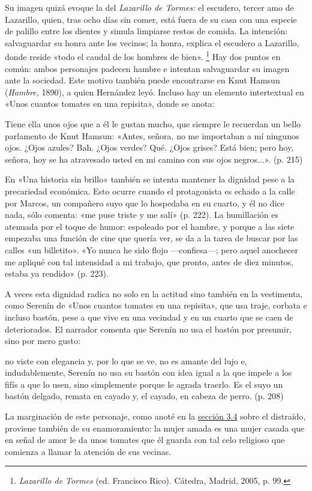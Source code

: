 \documentclass[14pt,twoside,final]{extbook} %
\let\oldfootnote\footnote
\renewcommand\footnote[1]{%
\oldfootnote{\hspace{1mm}#1}}
\begin{document}
Su imagen quizá evoque la del \emph{Lazarillo de Tormes:} el escudero, tercer amo de Lazarillo, quien, tras ocho días sin comer, está fuera de su casa con una especie de palillo entre los dientes y simula limpiarse restos de comida. La intención: salvaguardar su honra ante los vecinos; la honra, explica el escudero a Lazarillo, donde reside «todo el caudal de los hombres de bien».\footnote{\emph{Lazarillo de Tormes} (ed. Francisco Rico). Cátedra, Madrid, 2005, p. 99.} Hay dos puntos en común: ambos personajes padecen hambre e intentan salvaguardar su imagen ante la sociedad. Este motivo también puede encontrarse en Knut Hamsun (\emph{Hambre,} 1890), a quien Hernández leyó. Incluso hay un elemento intertextual en «Unos cuantos tomates en una repisita», donde se anota: 
\begin{quoting}
Tiene ella unos ojos que a él le gustan mucho, que siempre le recuerdan un bello parlamento de Knut Hamsun: «Antes, señora, no me importaban a mí ningunos ojos. ¿Ojos azules? Bah. ¿Ojos verdes? Qué. ¿Ojos grises? Está bien; pero hoy, señora, hoy se ha atravesado usted en mi camino con sus ojos negros...». (p. 215)
\end{quoting}
En «Una historia sin brillo» también se intenta mantener la dignidad pese a la precariedad económica. Esto ocurre cuando el protagonista es echado a la calle por Marcos, un compañero suyo que lo hospedaba en su cuarto, y él no dice nada, sólo comenta: «me puse triste y me salí» (p. 222). La humillación es atenuada por el toque de humor: espoleado por el hambre, y porque a las siete empezaba una función de cine que quería ver, se da a la tarea de buscar por las calles «un billetito». «Yo nunca he sido flojo ---confiesa---; pero aquel anochecer me apliqué con tal intensidad a mi trabajo, que pronto, antes de diez minutos, estaba ya rendido» (p. 223).

A veces esta dignidad radica no solo en la actitud sino también en la vestimenta, como Serenín de «Unos cuantos tomates en una repisita», que usa traje, corbata e incluso bastón, pese a que vive en una vecindad y en un cuarto que se caen de deteriorados. El narrador comenta que Serenín no usa el bastón por presumir, sino por mero gusto:
\begin{quoting}
no viste con elegancia y, por lo que se ve, no es amante del lujo e, indudablemente, Serenín no usa su bastón con idea igual a la que impele a los fifís a que lo usen, sino simplemente porque le agrada traerlo. Es el suyo un bastón delgado, remata en cayado y, el cayado, en cabeza de perro. (p. 208)
\end{quoting}
La marginación de este personaje, como anoté en la \hyperref[sec:el-distraido]{sección 3.4} sobre el distraído, proviene también de su enamoramiento: la mujer amada es una mujer casada que en señal de amor le da unos tomates que él guarda con tal celo religioso que comienza a llamar la atención de sus vecinas.
\end{document}
